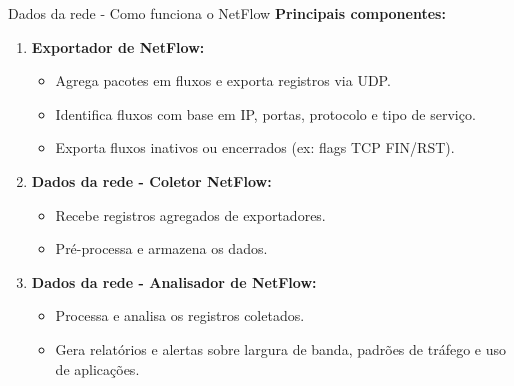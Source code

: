 \begin{frame}{Dados da rede - Como funciona o NetFlow}
    \textbf{Principais componentes:}
    \begin{enumerate}
        \item \textbf{Exportador de NetFlow:}
              \begin{itemize}
                  \item Agrega pacotes em fluxos e exporta registros via UDP.
                  \item Identifica fluxos com base em IP, portas, protocolo e tipo de serviço.
                  \item Exporta fluxos inativos ou encerrados (ex: flags TCP FIN/RST).
              \end{itemize}

        \item \textbf{Dados da rede - Coletor NetFlow:}
              \begin{itemize}
                  \item Recebe registros agregados de exportadores.
                  \item Pré-processa e armazena os dados.
              \end{itemize}

        \item \textbf{Dados da rede - Analisador de NetFlow:}
              \begin{itemize}
                  \item Processa e analisa os registros coletados.
                  \item Gera relatórios e alertas sobre largura de banda, padrões de tráfego e uso de aplicações.
              \end{itemize}
    \end{enumerate}
\end{frame}


